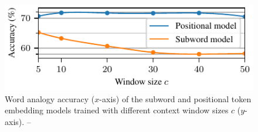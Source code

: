 \begin{figure}
\vspace*{-0.65cm}
\includegraphics[width=0.55\columnwidth,
                 trim={0 0.5cm 0 0},clip]{window-size-to-accuracy}
\vspace{-0.25cm}
\caption{Word analogy accuracy ($x$-axis) of the subword and positional token
         embedding models trained with different context window sizes $c$ ($y$-axis).
         -- \textcite[Figure 2]{novotny2021when}}
\end{figure}
\vspace{-0.2cm}